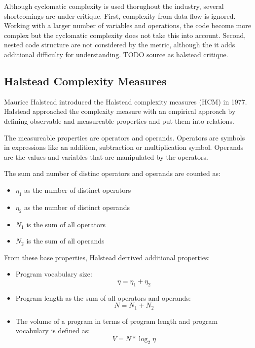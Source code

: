 Although cyclomatic complexity is used thorughout the industry, several shortcomings are under critique. First, complexity from data flow is ignored. Working with a larger number of variables and operations, the code become more complex but the cyclomatic complexity does not take this into account. Second, nested code structure are not considered by the metric, although the it adds additional difficulty for understanding. TODO source as halstead critique.

\subsection{Halstead Complexity Measures}
Maurice Halstead introduced the Halstead complexity measures (HCM) in 1977\cite{halstead1977elements}. Halstead approached the complexity measure with an empirical approach by defining observable and measureable properties and put them into relations.

The measureable properties are operators and operands. Operators are symbols in expressions like an addition, subtraction or multiplication symbol. Operands are the values and variables that are manipulated by the operators. 

The sum and number of distinc operators and operands are counted as:
\begin{itemize}
    \item $\eta_1$ as the number of distinct operators 
    \item $\eta_2$ as the number of distinct operands
    \item $N_1$ is the sum of all operators
    \item $N_2$ is the sum of all operands  
\end{itemize}

From these base properties, Halstead derrived additional properties:
\begin{itemize}
    \item Program vocabulary size:
    \begin{displaymath}
        \eta = \eta_1 + \eta_2
    \end{displaymath}
    \item Program length as the sum of all operators and operands:
    \begin{displaymath}
        N = N_1 + N_2
    \end{displaymath}
    \item The volume of a program in terms of program length and program vocabulary is defined as: 
    \begin{displaymath}
        V = N * \log_2{\eta}
    \end{displaymath}
\end{itemize}


